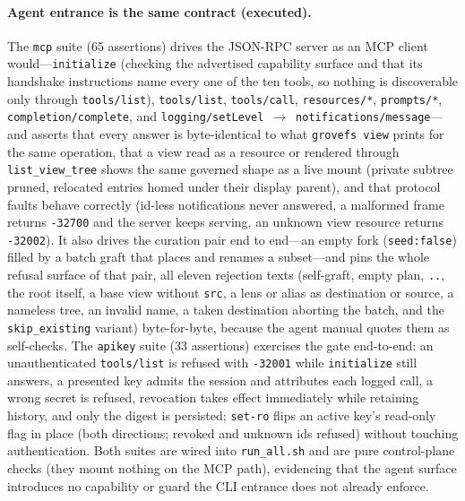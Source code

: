 \documentclass[numberedsection,acmtos]{acmart}
\begin{document}
\paragraph{Agent entrance is the same contract (executed).} The
\texttt{mcp} suite (65 assertions) drives the JSON-RPC server as an MCP client
would---\texttt{initialize} (checking the advertised capability surface and that
its handshake instructions name every one of the ten tools, so nothing is
discoverable only through \texttt{tools/list}),
\texttt{tools/list}, \texttt{tools/call}, \texttt{resources/*},
\texttt{prompts/*}, \texttt{completion/complete}, and
\texttt{logging/setLevel}~$\rightarrow$~\texttt{notifications/message}---and
asserts that every answer is byte-identical to what \texttt{grovefs view} prints
for the same operation, that a view read as a resource or rendered through
\texttt{list\_view\_tree} shows the same governed shape as a live mount (private
subtree pruned, relocated entries homed under their display parent), and that
protocol faults behave correctly (id-less notifications never answered, a
malformed frame returns \texttt{-32700} and the server keeps serving, an unknown
view resource returns \texttt{-32002}). It also drives the curation pair end to
end---an empty fork (\texttt{seed:false}) filled by a batch graft that places and
renames a subset---and pins the whole refusal surface of that pair, all eleven
rejection texts (self-graft, empty plan, \texttt{..}, the root itself, a base view
without \texttt{src}, a lens or alias as destination or source, a nameless tree,
an invalid name, a taken destination aborting the batch, and the
\texttt{skip\_existing} variant) byte-for-byte, because the agent manual quotes
them as self-checks. The \texttt{apikey} suite (33 assertions)
exercises the gate end-to-end: an unauthenticated \texttt{tools/list} is refused
with \texttt{-32001} while \texttt{initialize} still answers, a presented key
admits the session and attributes each logged call, a wrong secret is refused,
revocation takes effect immediately while retaining history, and only the digest
is persisted; \texttt{set-ro} flips an active key's read-only flag
in place (both directions; revoked and unknown ids refused) without touching
authentication. Both suites are wired into \texttt{run\_all.sh} and are pure
control-plane checks (they mount nothing on the MCP path), evidencing that the
agent surface introduces no capability or guard the CLI entrance does not
already enforce.
\end{document}
